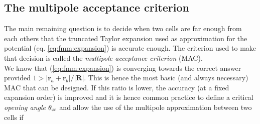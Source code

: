 \subsection{The multipole acceptance criterion}

The main remaining question is to decide when two cells are far enough from
each others that the truncated Taylor expansion used as approximation for
the potential (eq. \ref{eq:fmm:expansion}) is accurate enough. The
criterion used to make that decision is called the \emph{multipole
  acceptance criterion} (MAC). \\
We know that (\ref{eq:fmm:expansion}) is converging towards the correct
answer provided $1>|\mathbf{r}_a + \mathbf{r}_b| / |\mathbf{R}|$. This is
hence the most basic (and always necessary) MAC that can be designed. If
this ratio is lower, the accuracy (at a fixed expansion order) is improved
and it is hence common practice to define a critical \emph{opening angle}
$\theta_{\rm cr}$ and allow the use of the multipole approximation between
two cells if


